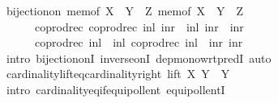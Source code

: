 \begin{isabellebody}
\ {\isachardoublequoteopen}bijection{\isacharunderscore}{\kern0pt}on\ {\isacharparenleft}{\kern0pt}mem{\isacharunderscore}{\kern0pt}of\ {\isacharparenleft}{\kern0pt}{\isacharparenleft}{\kern0pt}X\ {\isasymCoprod}\ Y{\isacharparenright}{\kern0pt}\ {\isasymCoprod}\ Z{\isacharparenright}{\kern0pt}{\isacharparenright}{\kern0pt}\ {\isacharparenleft}{\kern0pt}mem{\isacharunderscore}{\kern0pt}of\ {\isacharparenleft}{\kern0pt}X\ {\isasymCoprod}\ {\isacharparenleft}{\kern0pt}Y\ {\isasymCoprod}\ Z{\isacharparenright}{\kern0pt}{\isacharparenright}{\kern0pt}{\isacharparenright}{\kern0pt}\isanewline
\ \ \ \ \ \ {\isacharparenleft}{\kern0pt}coprod{\isacharunderscore}{\kern0pt}rec\ {\isacharparenleft}{\kern0pt}coprod{\isacharunderscore}{\kern0pt}rec\ inl\ {\isacharparenleft}{\kern0pt}inr\ {\isasymcirc}\ inl{\isacharparenright}{\kern0pt}{\isacharparenright}{\kern0pt}\ {\isacharparenleft}{\kern0pt}inr\ {\isasymcirc}\ inr{\isacharparenright}{\kern0pt}{\isacharparenright}{\kern0pt}\isanewline
\ \ \ \ \ \ {\isacharparenleft}{\kern0pt}coprod{\isacharunderscore}{\kern0pt}rec\ {\isacharparenleft}{\kern0pt}inl\ {\isasymcirc}\ inl{\isacharparenright}{\kern0pt}\ {\isacharparenleft}{\kern0pt}coprod{\isacharunderscore}{\kern0pt}rec\ {\isacharparenleft}{\kern0pt}inl\ {\isasymcirc}\ inr{\isacharparenright}{\kern0pt}\ inr{\isacharparenright}{\kern0pt}{\isacharparenright}{\kern0pt}{\isachardoublequoteclose}\isanewline
\ \ \ \ \ \isamarkupfalse%
\ {\isacharparenleft}{\kern0pt}intro\ bijection{\isacharunderscore}{\kern0pt}onI\ inverse{\isacharunderscore}{\kern0pt}onI\ dep{\isacharunderscore}{\kern0pt}mono{\isacharunderscore}{\kern0pt}wrt{\isacharunderscore}{\kern0pt}predI{\isacharparenright}{\kern0pt}\ auto\isanewline
\ \isamarkupfalse%
%
\endisatagproof
{\isafoldproof}%
%
\isadelimproof
\isanewline
%
\endisadelimproof
\isanewline
{}\isamarkupfalse%
\ cardinality{\isacharunderscore}{\kern0pt}lift{\isacharunderscore}{\kern0pt}eq{\isacharunderscore}{\kern0pt}cardinality{\isacharunderscore}{\kern0pt}right{\isacharcolon}{\kern0pt}\ {\isachardoublequoteopen}{\isacharbar}{\kern0pt}lift\ X\ Y{\isacharbar}{\kern0pt}\ {\isacharequal}{\kern0pt}\ {\isacharbar}{\kern0pt}Y{\isacharbar}{\kern0pt}{\isachardoublequoteclose}\isanewline
%
\isadelimproof
%
\endisadelimproof
%
\isatagproof
{}\isamarkupfalse%
\ {\isacharparenleft}{\kern0pt}intro\ cardinality{\isacharunderscore}{\kern0pt}eq{\isacharunderscore}{\kern0pt}if{\isacharunderscore}{\kern0pt}equipollent\ equipollentI{\isacharparenright}{\kern0pt}\isanewline
\ \ \isamarkupfalse%

\end{isabellebody}
